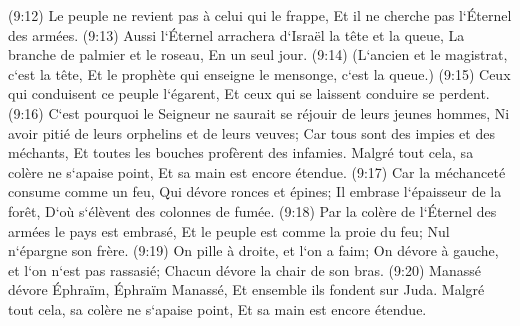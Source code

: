 \verse (9:12) Le peuple ne revient pas à celui qui le frappe, Et il ne cherche pas l`Éternel des armées. 
\verse (9:13) Aussi l`Éternel arrachera d`Israël la tête et la queue, La branche de palmier et le roseau, En un seul jour. 
\verse (9:14) (L`ancien et le magistrat, c`est la tête, Et le prophète qui enseigne le mensonge, c`est la queue.) 
\verse (9:15) Ceux qui conduisent ce peuple l`égarent, Et ceux qui se laissent conduire se perdent. 
\verse (9:16) C`est pourquoi le Seigneur ne saurait se réjouir de leurs jeunes hommes, Ni avoir pitié de leurs orphelins et de leurs veuves; Car tous sont des impies et des méchants, Et toutes les bouches profèrent des infamies. Malgré tout cela, sa colère ne s`apaise point, Et sa main est encore étendue. 
\verse (9:17) Car la méchanceté consume comme un feu, Qui dévore ronces et épines; Il embrase l`épaisseur de la forêt, D`où s`élèvent des colonnes de fumée. 
\verse (9:18) Par la colère de l`Éternel des armées le pays est embrasé, Et le peuple est comme la proie du feu; Nul n`épargne son frère. 
\verse (9:19) On pille à droite, et l`on a faim; On dévore à gauche, et l`on n`est pas rassasié; Chacun dévore la chair de son bras. 
\verse (9:20) Manassé dévore Éphraïm, Éphraïm Manassé, Et ensemble ils fondent sur Juda. Malgré tout cela, sa colère ne s`apaise point, Et sa main est encore étendue. 

